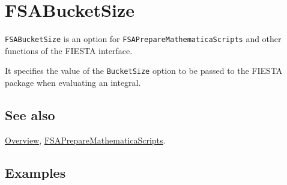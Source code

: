 \documentclass[../FeynHelpersManual.tex]{subfiles}
\begin{document}
\hypertarget{fsabucketsize}{
\section{FSABucketSize}\label{fsabucketsize}}

\texttt{FSABucketSize} is an option for
\texttt{FSAPrepareMathematicaScripts} and other functions of the FIESTA
interface.

It specifies the value of the \texttt{BucketSize} option to be passed to
the FIESTA package when evaluating an integral.

\subsection{See also}

\hyperlink{toc}{Overview},
\hyperlink{fsapreparemathematicascripts}{FSAPrepareMathematicaScripts}.

\subsection{Examples}
\end{document}
